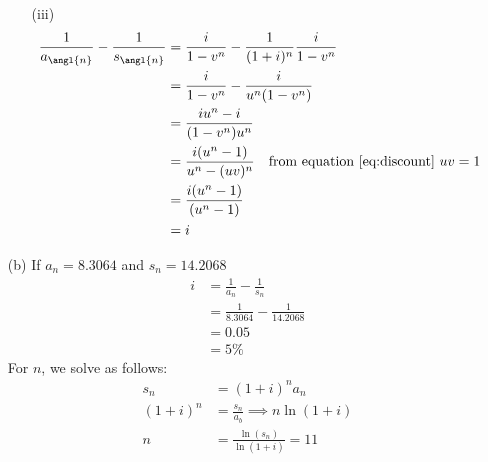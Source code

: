 \documentclass[12pt,a4paper]{article}
\begin{document}
\begin{enumerate}
\begin{enumerate}
						    \item[(iii)]
						    \begin{align*}
						        		\frac{1}{a_{\angl{n}} }  -  \frac{1}{s_{\angl{n}} }  &=  \frac{i}{ 1 - v^n} -  \frac{1}{(1 +i)^n} \frac{i}{1 - v^n}\\
						        		      &= \frac{i}{1 - v^n}  -  \frac{  i}{   u^n (1-v^n) }\\
						        		      &=   \frac{  iu^n  - i}{  (1-v^n)u^n}\\
						        		      &=  \frac{i(u^n -1) }{  u^n -  (uv)^n } \quad \text{from equation \eqref{eq:discount} } uv=1\\
						        		      &=  \frac{  i(u^n -1) }{ (u^n -1)}\\
						        		      &=  i  
 						    \end{align*}
				\end{enumerate}
			\item[(b)] If $a_n  =  8.3064 $ and $ s_n =  14.2068$\\
					\begin{align*}
								i  &=  \frac{1}{a_n} -  \frac{1}{s_n}	\\
								  &=  \frac{1}{8.3064} - \frac{1}{14.2068} \\
								  &=  0.05\\
								  &= 5\text{\%}
					\end{align*}	
			For $n$,  we solve as follows:\\
			\begin{align*}
						s_n  &=  \left(  1 + i \right)^n a_n\\
						 \left(  1 + i \right)^n &=  \frac{s_n}{a_b} \implies  n \ln(1+i)\\
						 n &=  \frac{  \ln(s_n) }{  \ln(1+i)  } =  11
			\end{align*}							 
\end{enumerate}
\end{document}
